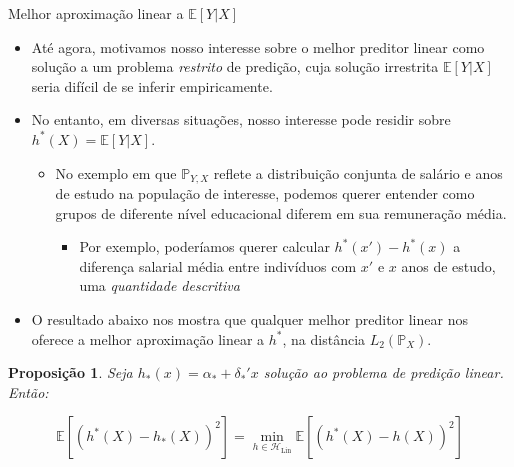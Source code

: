 \documentclass[11pt]{beamer}
\newtheorem{proposition}{Proposição}
\begin{document}
	\begin{frame}{Melhor aproximação linear a $\mathbb{E}[Y|X]$}
	\begin{itemize}
		\item Até agora, motivamos nosso interesse sobre o melhor preditor linear como solução a um problema \emph{restrito} de predição, cuja solução irrestrita $\mathbb{E}[Y|X]$ seria difícil de se inferir empiricamente.
		\item No entanto, em diversas situações, nosso interesse pode residir sobre $h^*(X)= \mathbb{E}[Y|X]$.
		\begin{itemize}
			\item No exemplo em que $\mathbb{P}_{Y,X}$ reflete a distribuição conjunta de salário e anos de estudo na população de interesse, podemos querer entender como grupos de diferente nível educacional diferem em sua remuneração média. 
			\begin{itemize}
				\item Por exemplo, poderíamos querer calcular $h^*(x') - h^*(x)$ a diferença salarial média entre indivíduos com $x'$ e $x$ anos de estudo, uma \emph{\color{blue}quantidade descritiva}
			\end{itemize}
		\end{itemize}
		\item O resultado abaixo nos mostra que qualquer melhor preditor linear nos oferece a melhor aproximação linear a $h^*$, na distância $L_2(\mathbb{P}_X)$.		
	\end{itemize}

\begin{proposition}
	Seja  $h_*(x) = \alpha_* + \delta_*'x$ solução ao problema de predição linear. Então:
	
	$$\mathbb{E}[(h^*(X)-h_*(X))^2] = \min_{h \in \mathcal{H}_{\text{Lin}}} \mathbb{E}[(h^*(X)-h(X))^2]$$
	
\end{proposition}
	\end{frame}
\end{document}
